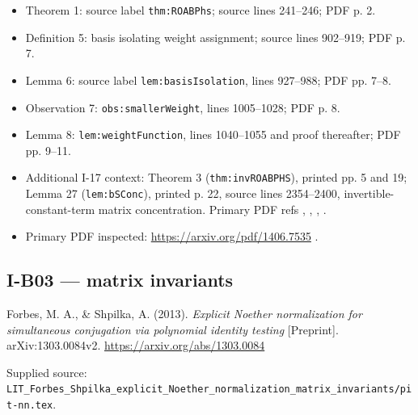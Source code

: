 \documentclass[11pt,a4paper]{article}
\providecommand{\tightlist}{\setlength{\itemsep}{0pt}\setlength{\parskip}{0pt}}
\theoremstyle{definition}\newtheorem{definition}{Definition}
\begin{document}
\begin{itemize}
\tightlist
\item
  Theorem 1: source label \nolinkurl{thm:ROABPhs}; source lines 241--246;
  PDF p. 2.
\item
  Definition 5: basis isolating weight assignment; source lines
  902--919; PDF p. 7.
\item
  Lemma 6: source label \nolinkurl{lem:basisIsolation}, lines 927--988; PDF
  pp. 7--8.
\item
  Observation 7: \nolinkurl{obs:smallerWeight}, lines 1005--1028; PDF p. 8.
\item
  Lemma 8: \nolinkurl{lem:weightFunction}, lines 1040--1055 and proof
  thereafter; PDF pp. 9--11.
\item
  Additional I-17 context: Theorem 3 (\nolinkurl{thm:invROABPHS}), printed
  pp. 5 and 19; Lemma 27 (\nolinkurl{lem:bSConc}), printed p. 22, source
  lines 2354--2400, invertible-constant-term matrix concentration.
  Primary PDF refs , , , .
\item
  Primary PDF inspected: \url{https://arxiv.org/pdf/1406.7535} .
\end{itemize}

\subsection{I-B03 --- matrix invariants}\label{i-b03--matrix-invariants}

Forbes, M. A., \& Shpilka, A. (2013). \emph{Explicit Noether
normalization for simultaneous conjugation via polynomial identity
testing} {[}Preprint{]}. arXiv:1303.0084v2.
\url{https://arxiv.org/abs/1303.0084}

Supplied source:
\nolinkurl{LIT_Forbes_Shpilka_explicit_Noether_normalization_matrix_invariants/pit-nn.tex}.
\end{document}
